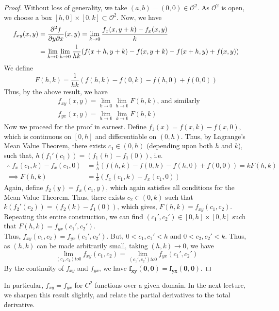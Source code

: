\documentclass[../Analysis-3]{subfiles}
\begin{document}
\begin{proof}
    Without loss of generality, we take $(a,b) = (0,0) \in \mathcal{O}^2$. As $\mathcal{O}^2$ is open, we choose a box $[h,0]\times [0,k] \subset \mathcal{O}^2$. Now, we have
    \begin{align*}
        f_{xy}(x,y) & = \pdv{f}{y}{x}\/(x,y) = \lim_{k \to 0} \frac{f_x(x,y+k) - f_x(x,y)}{k}                \\
                    & = \lim_{k \to 0} \lim_{h \to 0} \frac{1}{hk}(f(x+h,y+k) - f(x,y+k) - f(x+h,y)+ f(x,y))
    \end{align*}
    We define
    \[F(h,k) = \frac{1}{hk}(f(h,k) - f(0,k) - f(h,0)+ f(0,0))\]
    Thus, by the above result, we have
    \begin{align*}
         & f_{xy}(x,y) = \lim_{k \to 0} \lim_{h \to 0} F(h,k) \text{, and similarly} \\ &f_{yx}(x,y) = \lim_{h \to 0} \lim_{k \to 0} F(h,k)
    \end{align*}
    Now we proceed for the proof in earnest. Define $f_1(x) = f(x,k) - f(x,0)$, which is continuous on $[0,h]$ and differentiable on $(0,h)$. Thus, by Lagrange's Mean Value Theorem, there exists $c_1 \in (0,h)$ (depending upon both $h$ and $k$), such that, $h(f_1'(c_1)) = (f_1(h) - f_1(0))$, i.e.
    \begin{align*}
        \therefore\; f_x(c_1,k) - f_x(c_1,0) & =  \frac{1}{h}(f(h,k) - f(0,k) - f(h,0)+ f(0,0)) = kF(h,k) \\
        \implies F(h,k)                      & = \frac{1}{k}(f_x(c_1,k) - f_x(c_1,0))
    \end{align*}
    Again, define $f_2(y) = f_x(c_1,y)$, which again satisfies all conditions for the Mean Value Theorem. Thus, there exists $c_2 \in (0,k)$ such that $k(f_2'(c_2)) = (f_2(k) - f_1(0))$, which gives, $F(h,k) = f_{xy}(c_1, c_2)$.\\
    Repeating this entire construction, we can find $(c_1', c_2') \in [0,h]\times[0,k]$ such that $F(h,k) = f_{yx}(c_1', c_2')$.\\
    Thus, $f_{xy}(c_1, c_2) = f_{yx}(c_1', c_2')$. But, $0 < c_1, c_1' < h$ and $0 < c_2, c_2' < k$. Thus, as $(h,k)$ can be made arbitrarily small, taking  $(h,k) \to 0$, we have
    \[
        \lim_{(c_1, c_2) to 0} f_{xy}(c_1, c_2) = \lim_{(c_1', c_2') to 0} f_{yx}(c_1', c_2')
    \]
    By the continuity of $f_{xy}$ and $f_{yx}$, we have $\mathbf{f_{xy}(0,0) = f_{yx}(0,0)}$.

\end{proof}
\vspace{.2 cm}

In particular, $f_{xy} = f_{yx}$ for $C^2$ functions over a given domain. In the next lecture, we sharpen this result slightly, and relate the  partial derivatives to the total derivative.
\end{document}
